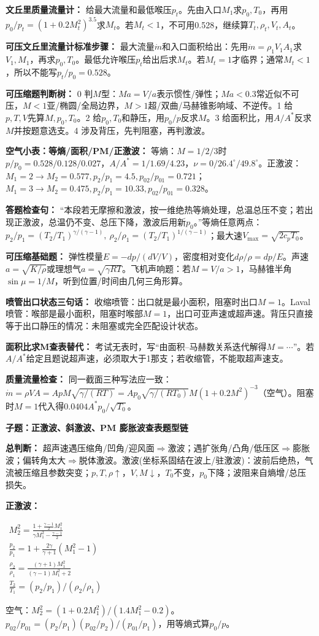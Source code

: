 \documentclass[a4paper]{article}
\newcommand{\qt}[1]{\vspace{0.04pt}\colorbox{Q}{\parbox{\dimexpr\linewidth-2\fboxsep}{\color{white}\bfseries #1}}\par}
\newcommand{\ans}[1]{\colorbox{G}{\parbox{\dimexpr\linewidth-2\fboxsep}{#1}}\par}
\newcommand{\sect}[1]{\par{\bfseries\color{Q}#1：}}
\newcommand{\fmlb}[1]{\ans{\begin{adjustbox}{max width=.96\linewidth}$\displaystyle #1$\end{adjustbox}}}
\newcommand{\schemeshock}{}
\begin{document}
\begin{multicols}{3}
{\sect{文丘里质量流量计}
给最大流量和最低喉压$p_t$。先由入口$M_1$求$p_0,T_0$，再用$p_0/p_t=(1+0.2M_t^2)^{3.5}$求$M_t$。若$M_t<1$，不可用0.528，继续算$T_t,\rho_t,V_t,A_t$。
\sect{可压文丘里流量计标准步骤}
最大流量$\dot m$和入口面积给出：先用$\dot m=\rho_1V_1A_1$求$V_1,M_1$，再求$p_0,T_0$。最低允许喉压$p_t$给出后求$M_t$。若$M_t=1$才临界；通常$M_t<1$，所以不能写$p_t/p_0=0.528$。
\sect{可压缩题判断树}
0 判$M$型：$Ma=V/a$表示惯性/弹性；$Ma<0.3$常近似不可压，$M<1$亚/椭圆/全局边界，$M>1$超/双曲/马赫锥影响域、不逆传。1 给$p,T,V$先算$M,p_0,T_0$。2 给$p_0,T_0$和静压，用$p_0/p$反求$M$。3 给面积比，用$A/A^*$反求$M$并按题意选支。4 涉及背压，先判阻塞，再判激波。
\sect{空气小表：等熵/面积/PM/正激波}
等熵：$M=1/2/3$时$p/p_0=0.528/0.128/0.027$，$A/A^*=1/1.69/4.23$，$\nu=0/26.4^\circ/49.8^\circ$。正激波：$M_1=2\to M_2=0.577,p_2/p_1=4.5,p_{02}/p_{01}=0.721$；$M_1=3\to M_2=0.475,p_2/p_1=10.33,p_{02}/p_{01}=0.328$。
\sect{答题检查句}
“本段若无摩擦和激波，按一维绝热等熵处理，总温总压不变；若出现正激波，总温仍不变、总压下降，激波后用新$p_0$。”等熵任意两点：$p_2/p_1=(T_2/T_1)^{\gamma/(\gamma-1)},\ \rho_2/\rho_1=(T_2/T_1)^{1/(\gamma-1)}$；最大速$V_{\max}=\sqrt{2c_pT_0}$。
\sect{可压缩基础题}
弹性模量$E=-dp/(dV/V)$，密度相对变化$d\rho/\rho=dp/E$。声速$a=\sqrt{K/\rho}$或理想气$a=\sqrt{\gamma RT}$。飞机声响题：若$M=V/a>1$，马赫锥半角$\sin\mu=1/M$，听到位置/时间由几何三角形算。
\sect{喷管出口状态三句话}
收缩喷管：出口就是最小面积，阻塞时出口$M=1$。Laval喷管：喉部是最小面积，阻塞时喉部$M=1$，出口可亚声速或超声速。背压只直接等于出口静压的情况：未阻塞或完全匹配设计状态。
\sect{面积比求M查表替代}
考试无表时，写“由面积--马赫数关系迭代解得$M=\cdots$”。若$A/A^*$给定且题说超声速，必须取大于1那支；若收缩管，不能取超声速支。
\sect{质量流量检查}
同一截面三种写法应一致：$\dot m=\rho VA=ApM\sqrt{\gamma/(RT)}=A p_0\sqrt{\gamma/(RT_0)}M(1+0.2M^2)^{-3}$（空气）。阻塞时$M=1$代入得$0.0404A^*p_0/\sqrt{T_0}$。
}

\qt{子题：正激波、斜激波、PM 膨胀波查表题型链}
{\fontsize{2.66}{2.82}\selectfont
\schemeshock
\sect{总判断}
超声速遇压缩角/凹角/迎风面$\Rightarrow$激波；遇扩张角/凸角/低压区$\Rightarrow$膨胀波；偏转角太大$\Rightarrow$脱体激波。激波(坐标系固结在波上/驻激波)：波前后绝热，气流被压缩且参数突变；$p,T,\rho\uparrow$，$V,M\downarrow$，$T_0$不变，$p_0$下降；波阻来自熵增/总压损失。

\sect{正激波}
\fmlb{\begin{gathered}
M_2^2=\frac{1+\frac{\gamma-1}{2}M_1^2}{\gamma M_1^2-\frac{\gamma-1}{2}}\\
\frac{p_2}{p_1}=1+\frac{2\gamma}{\gamma+1}(M_1^2-1)\\
\frac{\rho_2}{\rho_1}=\frac{(\gamma+1)M_1^2}{(\gamma-1)M_1^2+2}\\
\frac{T_2}{T_1}=(p_2/p_1)/(\rho_2/\rho_1)
\end{gathered}}
空气：$M_2^2=(1+0.2M_1^2)/(1.4M_1^2-0.2)$。\\
$p_{02}/p_{01}=(p_2/p_1)(p_{02}/p_2)/(p_{01}/p_1)$，用等熵式算$p_0/p$。

}
\end{multicols}
\end{document}
